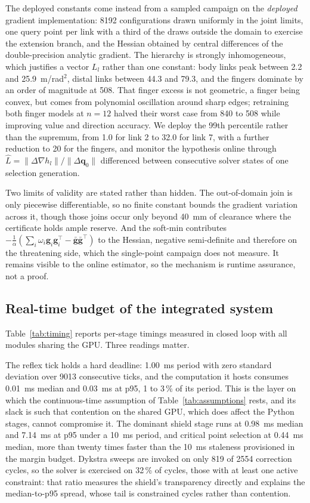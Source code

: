 \documentclass[journal]{IEEEtran}
\begin{document}
The deployed constants come instead from a sampled campaign on the \emph{deployed} gradient implementation: 8192 configurations drawn uniformly in the joint limits, one query point per link with a third of the draws outside the domain to exercise the extension branch, and the Hessian obtained by central differences of the double-precision analytic gradient. The hierarchy is strongly inhomogeneous, which justifies a vector $L_l$ rather than one constant: body links peak between 2.2 and 25.9~m/rad$^2$, distal links between 44.3 and 79.3, and the fingers dominate by an order of magnitude at 508. That finger excess is not geometric, a finger being convex, but comes from polynomial oscillation around sharp edges; retraining both finger models at $n=12$ halved their worst case from 840 to 508 while improving value and direction accuracy. We deploy the 99th percentile rather than the supremum, from 1.0 for link 2 to 32.0 for link 7, with a further reduction to 20 for the fingers, and monitor the hypothesis online through $\hat L=\|\Delta\nabla h_l\|/\|\Delta\mathbf{q}_0\|$ differenced between consecutive solver states of one selection generation.

Two limits of validity are stated rather than hidden. The out-of-domain join is only piecewise differentiable, so no finite constant bounds the gradient variation across it, though those joins occur only beyond 40~mm of clearance where the certificate holds ample reserve. And the soft-min contributes $-\tfrac1\alpha(\sum_i\omega_i\mathbf{g}_i\mathbf{g}_i^{\top}-\bar{\mathbf{g}}\bar{\mathbf{g}}^{\top})$ to the Hessian, negative semi-definite and therefore on the threatening side, which the single-point campaign does not measure. It remains visible to the online estimator, so the mechanism is runtime assurance, not a proof.

\subsection{Real-time budget of the integrated system}\label{subsec:res_timing}
Table~\ref{tab:timing} reports per-stage timings measured in closed loop with all modules sharing the GPU. Three readings matter.

The reflex tick holds a hard deadline: 1.00~ms period with zero standard deviation over 9013 consecutive ticks, and the computation it hosts consumes 0.01~ms median and 0.03~ms at p95, 1 to 3\,\% of its period. This is the layer on which the continuous-time assumption of Table~\ref{tab:assumptions} rests, and its slack is such that contention on the shared GPU, which does affect the Python stages, cannot compromise it. The dominant shield stage runs at 0.98~ms median and 7.14~ms at p95 under a 10~ms period, and critical point selection at 0.44~ms median, more than twenty times faster than the 10~ms staleness provisioned in the margin budget. Dykstra sweeps are invoked on only 819 of 2554 correction cycles, so the solver is exercised on 32\,\% of cycles, those with at least one active constraint: that ratio measures the shield's transparency directly and explains the median-to-p95 spread, whose tail is constrained cycles rather than contention.
\end{document}

